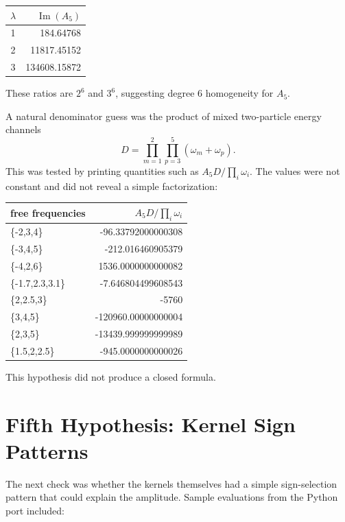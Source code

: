 \documentclass[11pt]{article}
\begin{document}
\begin{center}
\begin{tabular}{c r}
\(\lambda\) & \(\operatorname{Im}(A_5)\)\\
\hline
1 & 184.64768\\
2 & 11817.45152\\
3 & 134608.15872
\end{tabular}
\end{center}

These ratios are \(2^6\) and \(3^6\), suggesting degree \(6\) homogeneity for
\(A_5\).

A natural denominator guess was the product of mixed two-particle energy
channels
\[
  D=\prod_{m=1}^{2}\prod_{p=3}^{5}(\omega_m+\omega_p).
\]
This was tested by printing quantities such as \(A_5D/\prod_i\omega_i\).
The values were not constant and did not reveal a simple factorization:

\begin{center}
\begin{tabular}{>{\ttfamily}l r}
free frequencies & \(A_5D/\prod_i\omega_i\)\\
\hline
\{-2,3,4\} & -96.33792000000308\\
\{-3,4,5\} & -212.016460905379\\
\{-4,2,6\} & 1536.0000000000082\\
\{-1.7,2.3,3.1\} & -7.646804499608543\\
\{2,2.5,3\} & -5760\\
\{3,4,5\} & -120960.00000000004\\
\{2,3,5\} & -13439.999999999989\\
\{1.5,2,2.5\} & -945.0000000000026
\end{tabular}
\end{center}

This hypothesis did not produce a closed formula.

\section{Fifth Hypothesis: Kernel Sign Patterns}

The next check was whether the kernels themselves had a simple sign-selection
pattern that could explain the amplitude.  Sample evaluations from the Python
port included:
\end{document}
